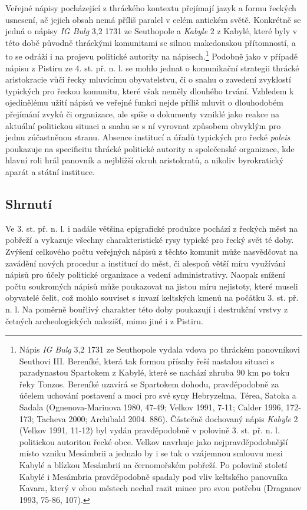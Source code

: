 Veřejné nápisy pocházející z thráckého kontextu přejímají jazyk a formu řeckých usnesení, ač jejich obsah nemá příliš paralel v celém antickém světě. Konkrétně se jedná o nápisy {\em IG Bulg} 3,2 1731 ze Seuthopole a {\em Kabyle} 2 z Kabylé, které byly v této době původně thráckými komunitami se silnou makedonskou přítomností, a to se odráží i na projevu politické autority na nápisech.\footnote{Nápis {\em IG Bulg} 3,2 1731 ze Seuthopole vydala vdova po thráckém panovníkovi Seuthovi III. Bereníké, která tak formou přísahy řeší nastalou situaci s paradynastou Spartokem z Kabylé, které se nachází zhruba 90 km po toku řeky Tonzos. Bereníké uzavírá se Spartokem dohodu, pravděpodobně za účelem uchování postavení a moci pro své syny Hebryzelma, Térea, Satoka a Sadala (Ognenova-Marinova 1980, 47-49; Velkov 1991, 7-11; Calder 1996, 172-173; Tacheva 2000; Archibald 2004. 886). Částečně dochovaný nápis {\em Kabyle} 2 (Velkov 1991, 11-12) byl vydán pravděpodobně v polovině 3. st. př. n. l. politickou autoritou řecké obce. Velkov navrhuje jako nejpravděpodobnější místo vzniku Mesámbrii a jednalo by i se tak o vzájemnou smlouvu mezi Kabylé a blízkou Mesámbrií na černomořském pobřeží. Po polovině století Kabylé i Mesámbria pravděpodobně spadaly pod vliv keltského panovníka Kavara, který v obou městech nechal razit mince pro svou potřebu (Draganov 1993, 75-86, 107).} Podobně jako v případě nápisu z Pistiru ze 4. st. př. n. l. se mohlo jednat o komunikační strategii thrácké aristokracie vůči řecky mluvícímu obyvatelstvu, či o snahu o zavedení zvyklostí typických pro řeckou komunitu, které však neměly dlouhého trvání. Vzhledem k ojedinělému užití nápisů ve veřejné funkci nejde příliš mluvit o dlouhodobém přejímání zvyků či organizace, ale spíše o dokumenty vzniklé jako reakce na aktuální politickou situaci a snahu se s ní vyrovnat způsobem obvyklým pro jednu zúčastněnou stranu. Absence institucí a úřadů typických pro řecké {\em poleis} poukazuje na specificitu thrácké politické autority a společenské organizace, kde hlavní roli hrál panovník a nejbližší okruh aristokratů, a nikoliv byrokratický aparát a státní instituce.

\subsection[shrnutí-9]{Shrnutí}

Ve 3. st. př. n. l. i nadále většina epigrafické produkce pochází z řeckých měst na pobřeží a vykazuje všechny charakteristické rysy typické pro řecký svět té doby. Zvýšení celkového počtu veřejných nápisů z těchto komunit může nasvědčovat na zavádění nových procedur a institucí do měst, či alespoň větší míru využívání nápisů pro účely politické organizace a vedení administrativy. Naopak snížení počtu soukromých nápisů může poukazovat na jistou míru nejistoty, které museli obyvatelé čelit, což mohlo souviset s invazí keltských kmenů na počátku 3. st. př. n. l. Na poměrně bouřlivý charakter této doby poukazují i destrukční vrstvy z četných archeologických nalezišť, mimo jiné i z Pistiru.

